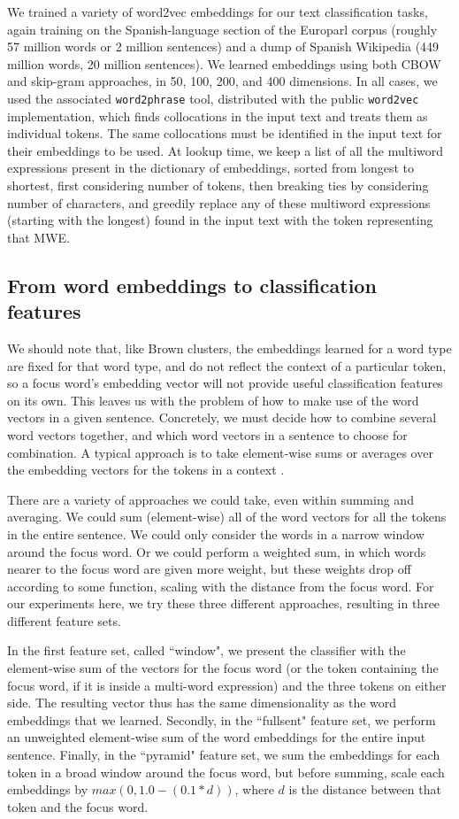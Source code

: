 We trained a variety of word2vec embeddings for our text classification tasks,
again training on the Spanish-language section of the Europarl corpus (roughly
57 million words or 2 million sentences) and a dump of Spanish Wikipedia (449
million words, 20 million sentences). We learned embeddings using both CBOW and
skip-gram approaches, in 50, 100, 200, and 400 dimensions. In all cases, we
used the associated \texttt{word2phrase} tool, distributed with the public
\texttt{word2vec} implementation, which finds collocations in the input text
and treats them as individual tokens. The same collocations must be identified
in the input text for their embeddings to be used. At lookup time, we keep a
list of all the multiword expressions present in the dictionary of embeddings,
sorted from longest to shortest, first considering number of tokens, then
breaking ties by considering number of characters, and greedily replace any of
these multiword expressions (starting with the longest) found in the input text
with the token representing that MWE.

\subsection{From word embeddings to classification features}
We should note that, like Brown clusters, the embeddings learned for a word
type are fixed for that word type, and do not reflect the context of a
particular token, so a focus word's embedding vector will not provide useful
classification features on its own. This leaves us with the problem of how to
make use of the word vectors in a given sentence. Concretely, we must decide
how to combine several word vectors together, and which word vectors in a
sentence to choose for combination. A typical approach is to take element-wise
sums or averages over the embedding vectors for the tokens in a context
\cite[Chapter 8]{Goldberg17}.

There are a variety of approaches we could take, even within summing and
averaging. We could sum (element-wise) all of the word vectors for all the
tokens in the entire sentence. We could only consider the words in a narrow
window around the focus word. Or we could perform a weighted sum, in which
words nearer to the focus word are given more weight, but these weights drop
off according to some function, scaling with the distance from the focus word.
For our experiments here, we try these three different approaches, resulting in
three different feature sets.

In the first feature set, called ``window", we present the classifier with the
element-wise sum of the vectors for the focus word (or the token containing the
focus word, if it is inside a multi-word expression) and the three tokens on
either side. The resulting vector thus has the same dimensionality as the word
embeddings that we learned. Secondly, in the ``fullsent" feature set, we
perform an unweighted element-wise sum of the word embeddings for the entire
input sentence. Finally, in the ``pyramid" feature set, we sum the embeddings
for each token in a broad window around the focus word, but before summing,
scale each embeddings by $max(0, 1.0 - (0.1 * d))$, where $d$ is the distance
between that token and the focus word.


